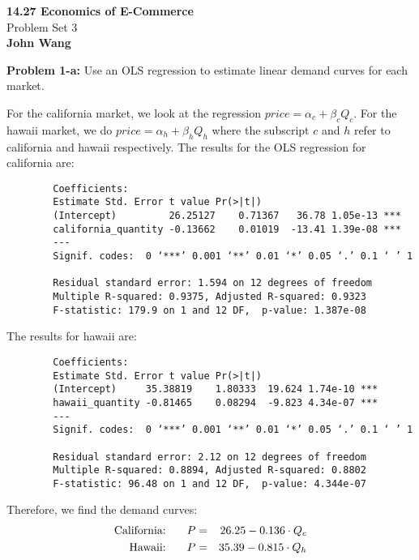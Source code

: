 \documentclass[psamsfonts]{amsart}
\newenvironment{sol}{\vspace{0.25cm}{\large \bfseries Solution:}}{\qedsymbol}
\newenvironment{prob}[1]{\begin{framed}{\large \bfseries Problem #1:}}{\end{framed}}
\newcommand{\makenewtitle}{
    \begin{center}
    {\huge \bfseries 14.27 Economics of E-Commerce} \\
    Problem Set 3\\
    \vspace{0.25cm}
    {\bfseries John Wang} 
    \end{center}
    \vspace{0.5cm}
}
\begin{document}
\makenewtitle

\begin{prob}{1-a}
Use an OLS regression to estimate linear demand curves for each market.
\end{prob}
\begin{sol}
For the california market, we look at the regression $price = \alpha_c + \beta_c Q_c$. For the hawaii market, we do $price = \alpha_h + \beta_h Q_h$ where the subscript $c$ and $h$ refer to california and hawaii respectively. The results for the OLS regression for california are:
\begin{verbatim}
        Coefficients:
        Estimate Std. Error t value Pr(>|t|)    
        (Intercept)         26.25127    0.71367   36.78 1.05e-13 ***
        california_quantity -0.13662    0.01019  -13.41 1.39e-08 ***
        ---
        Signif. codes:  0 ‘***’ 0.001 ‘**’ 0.01 ‘*’ 0.05 ‘.’ 0.1 ‘ ’ 1 
        
        Residual standard error: 1.594 on 12 degrees of freedom
        Multiple R-squared: 0.9375, Adjusted R-squared: 0.9323 
        F-statistic: 179.9 on 1 and 12 DF,  p-value: 1.387e-08 
\end{verbatim}

The results for hawaii are:
\begin{verbatim}
        Coefficients:
        Estimate Std. Error t value Pr(>|t|)    
        (Intercept)     35.38819    1.80333  19.624 1.74e-10 ***
        hawaii_quantity -0.81465    0.08294  -9.823 4.34e-07 ***
        ---
        Signif. codes:  0 ‘***’ 0.001 ‘**’ 0.01 ‘*’ 0.05 ‘.’ 0.1 ‘ ’ 1 
    
        Residual standard error: 2.12 on 12 degrees of freedom
        Multiple R-squared: 0.8894, Adjusted R-squared: 0.8802 
        F-statistic: 96.48 on 1 and 12 DF,  p-value: 4.344e-07 
\end{verbatim}

Therefore, we find the demand curves:
\begin{eqnarray}
\text{California: } \hspace{0.5cm} 
P &=& 26.25 - 0.136 \cdot Q_{c} \\
\text{Hawaii: } \hspace{0.5cm}
P &=& 35.39 - 0.815 \cdot Q_{h} 
\end{eqnarray}
\end{sol}
\end{document}
